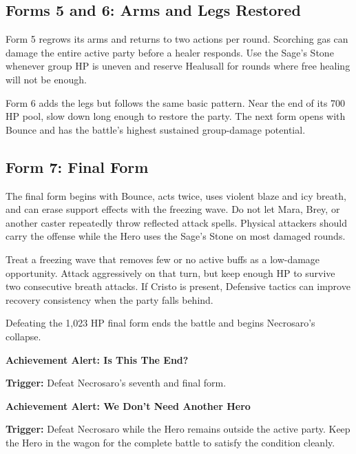 \documentclass[
  american,
  10pt,
  letterpaper,
  oneside,
  open=any]{scrreprt}
\begin{document}
\subsection{Forms 5 and 6: Arms and Legs
Restored}\label{forms-5-and-6-arms-and-legs-restored}

Form 5 regrows its arms and returns to two actions per round. Scorching
gas can damage the entire active party before a healer responds. Use the
Sage's Stone whenever group HP is uneven and reserve Healusall for
rounds where free healing will not be enough.

Form 6 adds the legs but follows the same basic pattern. Near the end of
its 700 HP pool, slow down long enough to restore the party. The next
form opens with Bounce and has the battle's highest sustained
group-damage potential.

\subsection{Form 7: Final Form}\label{form-7-final-form}

The final form begins with Bounce, acts twice, uses violent blaze and
icy breath, and can erase support effects with the freezing wave. Do not
let Mara, Brey, or another caster repeatedly throw reflected attack
spells. Physical attackers should carry the offense while the Hero uses
the Sage's Stone on most damaged rounds.

Treat a freezing wave that removes few or no active buffs as a
low-damage opportunity. Attack aggressively on that turn, but keep
enough HP to survive two consecutive breath attacks. If Cristo is
present, Defensive tactics can improve recovery consistency when the
party falls behind.

Defeating the 1,023 HP final form ends the battle and begins Necrosaro's
collapse.

\begin{achievementalert}

\textbf{Achievement Alert: Is This The End?}

\textbf{Trigger:} Defeat Necrosaro's seventh and final form.

\end{achievementalert}

\begin{achievementalert}

\textbf{Achievement Alert: We Don't Need Another Hero}

\textbf{Trigger:} Defeat Necrosaro while the Hero remains outside the
active party. Keep the Hero in the wagon for the complete battle to
satisfy the condition cleanly.

\end{achievementalert}
\end{document}
